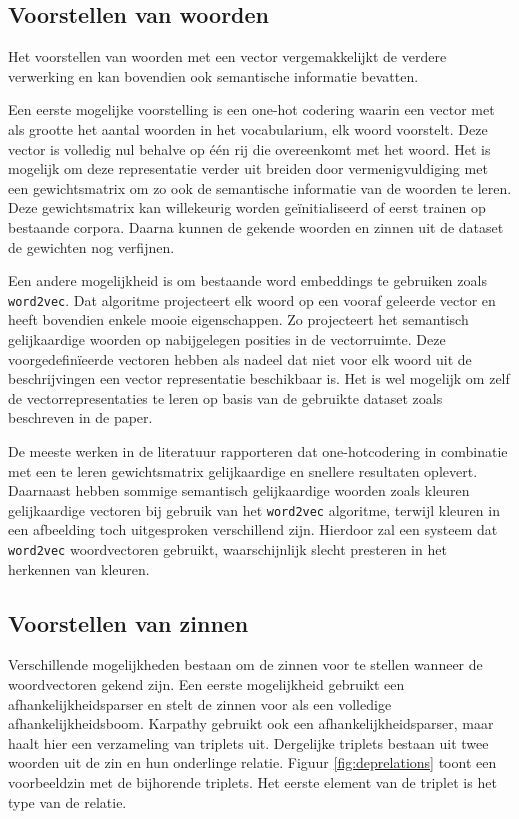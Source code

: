 \subsection{Voorstellen van woorden}
 Het voorstellen van woorden met een vector vergemakkelijkt de verdere verwerking en kan bovendien ook semantische informatie bevatten.

 Een eerste mogelijke voorstelling is een one-hot codering waarin een vector met als grootte het aantal woorden in het vocabularium, elk woord voorstelt. Deze vector is volledig nul behalve op \'e\'en rij die overeenkomt met het woord. Het is mogelijk om deze representatie verder uit breiden door vermenigvuldiging met een gewichtsmatrix om zo ook de semantische informatie van de woorden te leren. Deze gewichtsmatrix kan willekeurig worden ge\"initialiseerd of eerst trainen op bestaande corpora\cite{Lebret2013,Mao2014a,Google}. Daarna kunnen de gekende woorden en zinnen uit de dataset de gewichten nog verfijnen.  

 Een andere mogelijkheid is om bestaande word embeddings te gebruiken zoals \texttt{word2vec}. Dat algoritme projecteert elk woord op een vooraf geleerde vector en heeft bovendien enkele mooie eigenschappen. Zo projecteert het semantisch gelijkaardige woorden op nabijgelegen posities in de vectorruimte\cite{Mikolov2013}. Deze voorgedefin\"ieerde vectoren hebben als nadeel dat niet voor elk woord uit de beschrijvingen een vector representatie beschikbaar is. Het is wel mogelijk om zelf de vectorrepresentaties te leren op basis van de gebruikte dataset zoals beschreven in de paper.

 De meeste werken in de literatuur rapporteren dat one-hotcodering in combinatie met een te leren gewichtsmatrix gelijkaardige en snellere resultaten oplevert. Daarnaast hebben sommige semantisch gelijkaardige woorden zoals kleuren gelijkaardige vectoren bij gebruik van het \texttt{word2vec} algoritme, terwijl kleuren in een afbeelding toch uitgesproken verschillend zijn. Hierdoor zal een systeem dat \texttt{word2vec} woordvectoren gebruikt, waarschijnlijk slecht presteren in het herkennen van kleuren\cite{Karpathy2015}.
 
\subsection{Voorstellen van zinnen}
 Verschillende mogelijkheden bestaan om de zinnen voor te stellen wanneer de woordvectoren gekend zijn. Een eerste mogelijkheid gebruikt een afhankelijkheidsparser en stelt de zinnen voor als een volledige afhankelijkheidsboom\cite{Socher2014}. Karpathy\cite{Karpathy2014} gebruikt ook een afhankelijkheidsparser, maar haalt hier een verzameling van triplets uit. Dergelijke triplets bestaan uit twee woorden uit de zin en hun onderlinge relatie. Figuur \ref{fig:deprelations} toont een voorbeeldzin met de bijhorende triplets. Het eerste element van de triplet is het type van de relatie.


